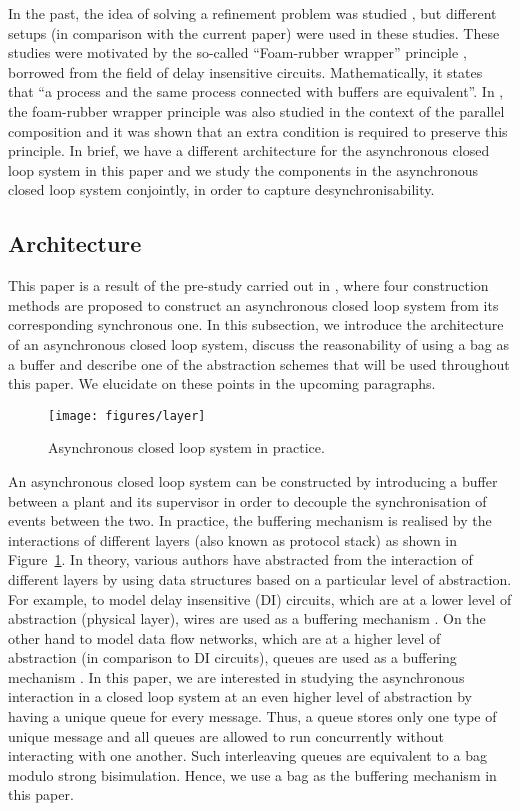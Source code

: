 \documentclass[copyright]{eptcs}
\theoremstyle{plain}
\theoremstyle{definition}
\begin{document}
In the past, the idea of solving a refinement problem was studied \citep{Fischer96,HHJ90,diccs}, but different setups (in comparison with the current paper) were used in these studies. These studies were motivated by the so-called ``Foam-rubber wrapper'' principle \citep{udding}, borrowed from the field of delay insensitive circuits. Mathematically, it states that ``a process and the same process connected with buffers are equivalent''. In \citep{Fischer96}, the foam-rubber wrapper principle was also studied in the context of the parallel composition and it was shown that an extra condition is required to preserve this principle. In brief, we have a different architecture for the asynchronous closed loop system in this paper and we study the components in the asynchronous closed loop system conjointly, in order to capture desynchronisability.


\subsection{Architecture}\label{subsec-arch}

This paper is a result of the pre-study carried out in \citep{prDCL}, where four construction methods are proposed to construct an asynchronous closed loop system from its corresponding synchronous one. In this subsection, we introduce the architecture of an asynchronous closed loop system, discuss the reasonability of using a bag as a buffer and describe one of the abstraction schemes that will be used throughout this paper. We elucidate on these points in the upcoming paragraphs.

\begin{figure}
\centering
\texttt{[image: figures/layer]}\\
  \caption{Asynchronous closed loop system in practice.}\label{fig:layer}
\end{figure}

An asynchronous closed loop system can be constructed by introducing a buffer between a plant and its supervisor in order to decouple the synchronisation of events between the two. In practice, the buffering mechanism is realised by the interactions of different layers (also known as protocol stack) as shown in Figure~\ref{fig:layer}. In theory, various authors \citep{Fischer96,HHJ90,MousaviDate04} have abstracted from the interaction of different layers by using data structures based on a particular level of abstraction. For example, to model delay insensitive (DI) circuits, which are at a lower level of abstraction (physical layer), wires are used as a buffering mechanism \citep{diccs}. On the other hand to model data flow networks, which are at a higher level of abstraction (in comparison to DI circuits), queues are used as a buffering mechanism \citep{HHJ90}. In this paper, we are interested in studying the asynchronous interaction in a closed loop system at an even higher level of abstraction by having a unique queue for every message. Thus, a queue stores only one type of unique message and all queues are allowed to run concurrently without interacting with one another. Such interleaving queues are equivalent to a bag modulo strong bisimulation. Hence, we use a bag as the buffering mechanism in this paper.
\end{document}
